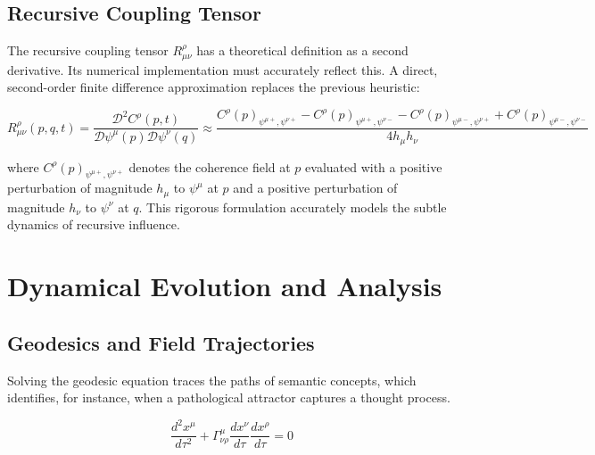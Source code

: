 
\subsection{Recursive Coupling Tensor}
\label{17.2.3:recursive_coupling_tensor}

The recursive coupling tensor \(R^\rho_{\mu\nu}\) has a theoretical definition as a second derivative. Its numerical implementation must accurately reflect this. A direct, second-order finite difference approximation replaces the previous heuristic:

\begin{equation}
R^\rho_{\mu\nu}(p,q,t) = \frac{\mathcal{D}^2 C^\rho(p,t)}{\mathcal{D} \psi^\mu(p) \mathcal{D} \psi^\nu(q)} \approx \frac{C^\rho(p)_{\psi^{\mu+},\psi^{\nu+}} - C^\rho(p)_{\psi^{\mu+},\psi^{\nu-}} - C^\rho(p)_{\psi^{\mu-},\psi^{\nu+}} + C^\rho(p)_{\psi^{\mu-},\psi^{\nu-}}}{4h_\mu h_\nu}
\end{equation}

where \(C^\rho(p)_{\psi^{\mu+},\psi^{\nu+}}\) denotes the coherence field at \(p\) evaluated with a positive perturbation of magnitude \(h_\mu\) to \(\psi^\mu\) at \(p\) and a positive perturbation of magnitude \(h_\nu\) to \(\psi^\nu\) at \(q\). This rigorous formulation accurately models the subtle dynamics of recursive influence.


\section{Dynamical Evolution and Analysis}
\label{17.3:dynamical_evolution_and_analysis}


\subsection{Geodesics and Field Trajectories}
\label{17.3.1:geodesics_and_field_trajectories}

Solving the geodesic equation traces the paths of semantic concepts, which identifies, for instance, when a pathological attractor captures a thought process.

\begin{equation}
\frac{d^2 x^{\mu}}{d\tau^2} + \Gamma^{\mu}_{\nu\rho} \frac{dx^{\nu}}{d\tau} \frac{dx^{\rho}}{d\tau} = 0
\end{equation}

